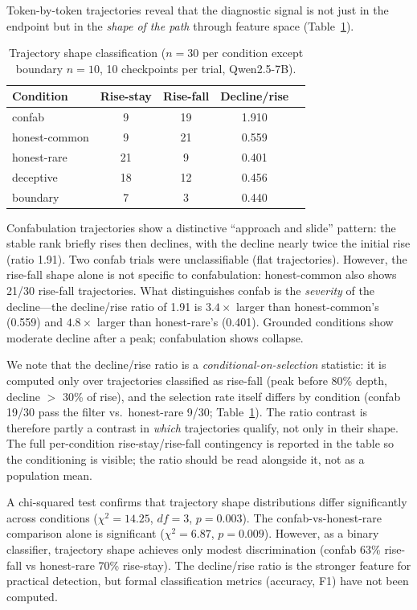 \documentclass[11pt,a4paper]{article}
\begin{document}
Token-by-token trajectories reveal that the diagnostic signal is not
just in the endpoint but in the \emph{shape of the path} through
feature space (Table~\ref{tab:trajectory}).

\begin{table}[ht]
\centering
\caption{Trajectory shape classification ($n = 30$ per condition
  except boundary $n = 10$, 10 checkpoints per trial, Qwen2.5-7B).}
\label{tab:trajectory}
\begin{tabular}{lcccc}
\toprule
\textbf{Condition} & \textbf{Rise-stay} & \textbf{Rise-fall} & \textbf{Decline/rise} \\
\midrule
confab & 9 & 19 & 1.910 \\
honest-common & 9 & 21 & 0.559 \\
honest-rare & 21 & 9 & 0.401 \\
deceptive & 18 & 12 & 0.456 \\
boundary & 7 & 3 & 0.440 \\
\bottomrule
\end{tabular}
\end{table}

Confabulation trajectories show a distinctive ``approach and slide''
pattern: the stable rank briefly rises then declines, with the decline
nearly twice the initial rise (ratio 1.91). Two confab trials were
unclassifiable (flat trajectories). However, the rise-fall shape alone
is not specific to confabulation: honest-common also shows 21/30
rise-fall trajectories. What distinguishes confab is the
\emph{severity} of the decline---the decline/rise ratio of 1.91 is
$3.4\times$ larger than honest-common's (0.559) and $4.8\times$
larger than honest-rare's (0.401). Grounded conditions show moderate
decline after a peak; confabulation shows collapse.

We note that the decline/rise ratio is a \emph{conditional-on-selection}
statistic: it is computed only over trajectories classified as rise-fall
(peak before 80\% depth, decline $>$ 30\% of rise), and the selection
rate itself differs by condition (confab 19/30 pass the filter vs.\
honest-rare 9/30; Table~\ref{tab:trajectory}). The ratio contrast is
therefore partly a contrast in \emph{which} trajectories qualify, not
only in their shape. The full per-condition rise-stay/rise-fall
contingency is reported in the table so the conditioning is visible;
the ratio should be read alongside it, not as a population mean.

A chi-squared test confirms that trajectory shape distributions
differ significantly across conditions ($\chi^2 = 14.25$, $df = 3$,
$p = 0.003$). The confab-vs-honest-rare comparison alone is
significant ($\chi^2 = 6.87$, $p = 0.009$). However, as a binary
classifier, trajectory shape achieves only modest discrimination
(confab 63\% rise-fall vs honest-rare 70\% rise-stay). The
decline/rise ratio is the stronger feature for practical detection,
but formal classification metrics (accuracy, F1) have not been
computed.
\end{document}
